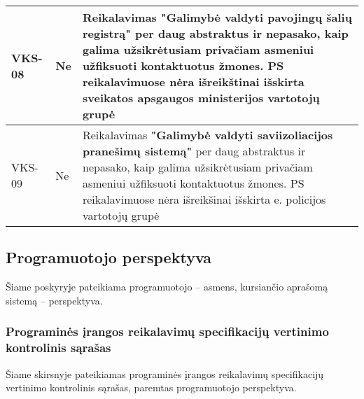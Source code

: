 \documentclass{VUMIFPSkursinis}
\begin{document}
\begin{center}
\begin{longtable}{|C{2cm}|L{2.5cm}|L{10cm}|}
 					VKS-08 &
 					Ne&
 					Reikalavimas \textbf{"Galimybė valdyti pavojingų šalių registrą"} per daug abstraktus ir nepasako, kaip galima užsikrėtusiam privačiam asmeniui užfiksuoti kontaktuotus žmones. PS reikalavimuose nėra išreikštinai išskirta sveikatos apsgaugos ministerijos vartotojų grupė\\ \hline  
 					VKS-09 &
 					Ne&
 					Reikalavimas \textbf{"Galimybė valdyti saviizoliacijos pranešimų sistemą"} per daug abstraktus ir nepasako, kaip galima užsikrėtusiam privačiam asmeniui užfiksuoti kontaktuotus žmones. PS reikalavimuose nėra išreikšinai išskirta e. policijos vartotojų grupė\\ \hline			
				\end{longtable}
			\end{center}		

\subsection{Programuotojo perspektyva}

Šiame poskyryje pateikiama programuotojo -- asmens, kursiančio aprašomą sistemą -- perspektyva.

\subsubsection{Programinės įrangos reikalavimų specifikacijų vertinimo kontrolinis sąrašas}

Šiame skirsnyje pateikiamas programinės įrangos reikalavimų specifikacijų vertinimo kontrolinis sąrašas,
paremtas programuotojo perspektyva.
\end{document}
